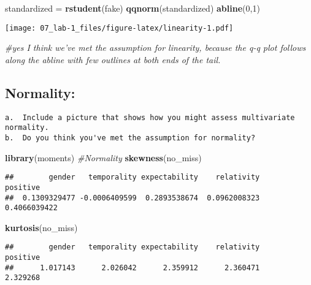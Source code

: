 \documentclass[
]{article}
\newenvironment{Shaded}{\begin{snugshade}}{\end{snugshade}}
\newcommand{\CommentTok}[1]{\textcolor[rgb]{0.56,0.35,0.01}{\textit{#1}}}
\newcommand{\DecValTok}[1]{\textcolor[rgb]{0.00,0.00,0.81}{#1}}
\newcommand{\KeywordTok}[1]{\textcolor[rgb]{0.13,0.29,0.53}{\textbf{#1}}}
\newcommand{\NormalTok}[1]{#1}
\newcommand{\StringTok}[1]{\textcolor[rgb]{0.31,0.60,0.02}{#1}}
\begin{document}
\begin{Shaded}
\begin{Highlighting}[]
\NormalTok{standardized =}\StringTok{ }\KeywordTok{rstudent}\NormalTok{(fake)}
\KeywordTok{qqnorm}\NormalTok{(standardized)}
\KeywordTok{abline}\NormalTok{(}\DecValTok{0}\NormalTok{,}\DecValTok{1}\NormalTok{)}
\end{Highlighting}
\end{Shaded}

\texttt{[image: 07\_lab-1\_files/figure-latex/linearity-1.pdf]}

\begin{Shaded}
\begin{Highlighting}[]
\CommentTok{#yes I think we've met the assumption for linearity, because the q-q plot follows along the abline with few outlines at both ends of the tail.}
\end{Highlighting}
\end{Shaded}

\hypertarget{normality}{%
\subsection{Normality:}\label{normality}}

\begin{verbatim}
a.  Include a picture that shows how you might assess multivariate normality.
b.  Do you think you've met the assumption for normality? 
\end{verbatim}

\begin{Shaded}
\begin{Highlighting}[]
\KeywordTok{library}\NormalTok{(moments)}
\CommentTok{#Normality}
\KeywordTok{skewness}\NormalTok{(no_miss)}
\end{Highlighting}
\end{Shaded}

\begin{verbatim}
##        gender   temporality expectability    relativity      positive 
##  0.1309329477 -0.0006409599  0.2893538674  0.0962008323  0.4066039422
\end{verbatim}

\begin{Shaded}
\begin{Highlighting}[]
\KeywordTok{kurtosis}\NormalTok{(no_miss)}
\end{Highlighting}
\end{Shaded}

\begin{verbatim}
##        gender   temporality expectability    relativity      positive 
##      1.017143      2.026042      2.359912      2.360471      2.329268
\end{verbatim}
\end{document}
